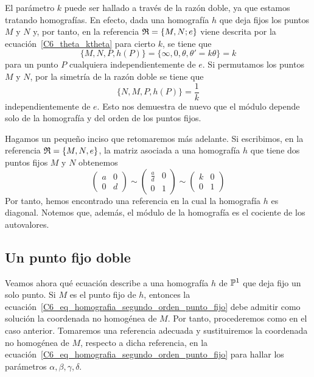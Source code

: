El parámetro $k$ puede ser hallado a través de la razón doble, ya que estamos tratando homografías. En efecto, dada una homografía $h$ que deja fijos los puntos $M$ y $N$ y, por tanto, en la referencia $\mathfrak{R}=\{M,N;e\}$ viene descrita por la ecuación~\eqref{C6_theta_ktheta} para cierto $k$, se tiene que
\begin{equation}
	\{M,N,P,h(P)\}=\{\infty,0,\theta,\theta'=k\theta\}=k
\end{equation}
para un punto $P$ cualquiera independientemente de $e$. Si permutamos los puntos $M$ y $N$, por la simetría de la razón doble se tiene que
\begin{equation}
	\{N,M,P,h(P)\}=\frac{1}{k}
\end{equation}
independientemente de $e$. Esto nos demuestra de nuevo que el módulo depende solo de la homografía y del orden de los puntos fijos.

Hagamos un pequeño inciso que retomaremos más adelante. Si escribimos, en la referencia $\mathfrak{R}=\{M,N,e\}$, la matriz asociada a una homografía $h$ que tiene dos puntos fijos $M$ y $N$ obtenemos
\begin{equation*}
	\left( \begin{array}{cc}
	a&0\\
	0&d
	\end{array}\right) 
	\sim \left( \begin{array}{cc}
	\frac{a}{d}&0\\
	0&1
	\end{array}\right) 
	\sim \left( \begin{array}{cc}
	k&0\\
	0&1
	\end{array}\right)
\end{equation*}
Por tanto, hemos encontrado una referencia en la cual la homografía $h$ es diagonal. Notemos que, además, el módulo de la homografía es el cociente de los autovalores.

\subsection{Un punto fijo doble}
Veamos ahora qué ecuación describe a una homografía $h$ de $\mathbb{P}^1$ que deja fijo un solo punto. Si $M$ es el punto fijo de $h$, entonces la ecuación~\eqref{C6_eq_homografia_segundo_orden_punto_fijo} debe admitir como solución la coordenada no homogénea de $M$. Por tanto, procederemos como en el caso anterior. Tomaremos una referencia adecuada y sustituiremos la coordenada no homogénea de $M$, respecto a dicha referencia, en la ecuación~\eqref{C6_eq_homografia_segundo_orden_punto_fijo} para hallar los parámetros $\alpha, \beta,\gamma,\delta$.

